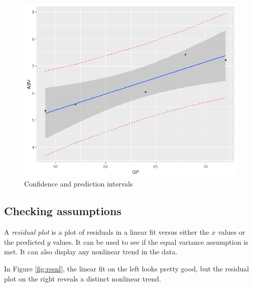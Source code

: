 \documentclass[
]{book}
\theoremstyle{definition}
\theoremstyle{definition}
\theoremstyle{definition}
\theoremstyle{definition}
\theoremstyle{remark}
\begin{document}
\begin{figure}

{\centering \includegraphics[width=0.75\linewidth]{images/beerpi} 

}

\caption{Confidence and prediction intervals}\label{fig:beerpi}
\end{figure}

\subsection*{Checking assumptions}\label{checking-assumptions}

A \emph{residual plot} is a plot of residuals in a linear fit versus either the \(x\) values or the predicted \(y\) values. It can be used to see if the equal variance assumption is met. It can also display any nonlinear trend in the data.

In Figure \ref{fig:resnl}, the linear fit on the left looks pretty good, but the residual plot on the right reveals a distinct nonlinear trend.
\end{document}
